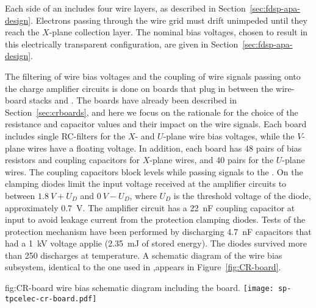 Each side of an  includes four wire layers, as 
described in Section~\ref{sec:fdsp-apa-design}. Electrons passing 
through the wire grid must drift unimpeded until they reach 
the $X$-plane collection layer. The nominal bias voltages, chosen %
to result in this electrically transparent configuration, %
are given in Section~\ref{sec:fdsp-apa-design}. 

The filtering of wire bias voltages and the  coupling 
of wire signals passing onto the charge amplifier circuits is 
done on  boards that plug in between the  
wire-board stacks and . The  boards
have already been described in Section~\ref{sec:crboards},
and here we focus on the rationale for the choice of the %
resistance and capacitor values and their impact on the
wire signals. Each  board includes single RC-filters 
for the $X$- and $U$-plane wire bias voltages, while the $V$-plane 
wires have a floating voltage. %
In addition, each board 
has \num{48} pairs of bias resistors and  coupling 
capacitors for $X$-plane wires, and \num{40} pairs for the $U$-plane 
wires. The coupling capacitors block  levels while passing  
signals to the . On the  
clamping diodes limit the input voltage received at the amplifier
circuits to between $\SI{1.8}{V}+U_D$ and $\SI{0}{V}-U_D$, where $U_D$
is the threshold voltage of the diode, approximately \SI{0.7}{V}.
The amplifier circuit has a \SI{22}{nF} coupling capacitor at
input to avoid leakage current from the protection clamping diodes.
Tests of the protection mechanism have been performed by discharging
\SI{4.7}{nF} capacitors that had a \SI{1}{kV} voltage applie (\SI{2.35}{mJ} of
stored energy). The diodes survived more than 250 discharges at \lntwo
temperature. A schematic diagram of the   wire bias 
subsystem, identical to the one used in ,appears
in Figure~\ref{fig:CR-board}.

\begin{dunefigure}
{fig:CR-board}
{  wire bias schematic diagram including the  board.}
\texttt{[image: sp-tpcelec-cr-board.pdf]}
\end{dunefigure}

